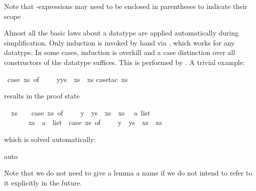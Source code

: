 \begin{isabellebody}
\begin{isamarkuptext}
Note that -expressions may need to be enclosed in parentheses to
indicate their scope%
\end{isamarkuptext}%
%
%
\begin{isamarkuptext}%
\label{sec:struct-ind-case}
Almost all the basic laws about a datatype are applied automatically during
simplification. Only induction is invoked by hand via ,
which works for any datatype. In some cases, induction is overkill and a case
distinction over all constructors of the datatype suffices. This is performed
by . A trivial example:%
\end{isamarkuptext}%
\ {\isachardoublequote}{\isacharparenleft}case\ xs\ of\ {\isacharbrackleft}{\isacharbrackright}\ {\isasymRightarrow}\ {\isacharbrackleft}{\isacharbrackright}\ {\isacharbar}\ y{\isacharhash}ys\ {\isasymRightarrow}\ xs{\isacharparenright}\ {\isacharequal}\ xs{\isachardoublequote}\isanewline
{}case{\isacharunderscore}tac\ xs{\isacharparenright}%
\begin{isamarkuptxt}%
\noindent
results in the proof state
\begin{isabelle}%
\ {}{\isachardot}\ xs\ {\isacharequal}\ {\isacharbrackleft}{\isacharbrackright}\ {\isasymLongrightarrow}\ {\isacharparenleft}case\ xs\ of\ {\isacharbrackleft}{\isacharbrackright}\ {\isasymRightarrow}\ {\isacharbrackleft}{\isacharbrackright}\ {\isacharbar}\ y\ {\isacharhash}\ ys\ {\isasymRightarrow}\ xs{\isacharparenright}\ {\isacharequal}\ xs\isanewline
\ {}{\isachardot}\ {\isasymAnd}a\ list{\isachardot}\isanewline
\ \ \ \ \ \ \ xs\ {\isacharequal}\ a\ {\isacharhash}\ list\ {\isasymLongrightarrow}\ {\isacharparenleft}case\ xs\ of\ {\isacharbrackleft}{\isacharbrackright}\ {\isasymRightarrow}\ {\isacharbrackleft}{\isacharbrackright}\ {\isacharbar}\ y\ {\isacharhash}\ ys\ {\isasymRightarrow}\ xs{\isacharparenright}\ {\isacharequal}\ xs%
\end{isabelle}
which is solved automatically:%
\end{isamarkuptxt}%
auto{\isacharparenright}%
\begin{isamarkuptext}%
Note that we do not need to give a lemma a name if we do not intend to refer
to it explicitly in the future.


\end{isamarkuptext}
\end{isabellebody}
